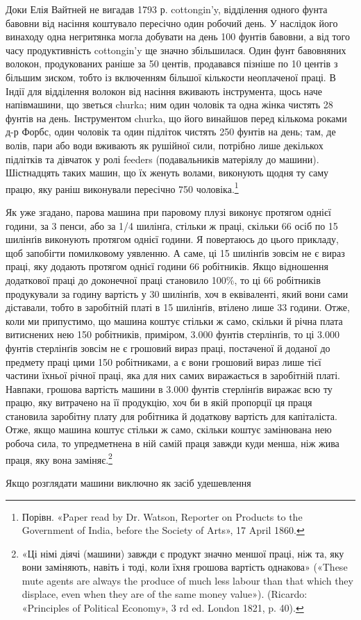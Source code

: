 \parcont{}  %
Доки Елія Вайтней не вигадав 1793 р. cottongin’y, відділення одного
фунта бавовни від насіння коштувало пересічно один робочий
день. У наслідок його винаходу одна негритянка могла добувати
на день 100 фунтів бавовни, а від того часу продуктивність cottongin’y
ще значно збільшилася. Один фунт бавовняних волокон,
продукованих раніше за 50 центів, продавався пізніше по
10 центів з більшим зиском, тобто із включенням більшої кількости
неоплаченої праці. В Індії для відділення волокон від насіння
вживають інструмента, щось наче напівмашини, що зветься
churka; ним один чоловік та одна жінка чистять 28 фунтів на день.
Інструментом churka, що його винайшов перед кількома роками д-р Форбс, один чоловік та один підліток
чистять 250 фунтів на
день; там, де волів, пари або води вживають як рушійної сили,
потрібно лише декількох підлітків та дівчаток у ролі feeders
(подавальників матеріялу до машини). Шістнадцять таких машин,
що їх женуть волами, виконують щодня ту саму працю, яку раніш
виконували пересічно 750 чоловіка.\footnote{
Порівн. «Paper read by Dr. Watson, Reporter on Products to the
Government of India, before the Society of Arts», 17 April 1860.
}

Як уже згадано, парова машина при паровому плузі виконує
протягом однієї години, за 3 пенси, або за 1/4 шилінґа, стільки ж
праці, скільки 66 осіб по 15 шилінґів виконують протягом однієї
години. Я повертаюсь до цього прикладу, щоб запобігти помилковому
уявленню. А саме, ці 15 шилінґів зовсім не є вираз праці, яку
додають протягом однієї години 66 робітників. Якщо відношення
додаткової праці до доконечної праці становило 100\%, то ці
66 робітників продукували за годину вартість у 30 шилінґів,
хоч в еквіваленті, який вони сами діставали, тобто в заробітній
платі в 15 шилінґів, втілено лише 33 години. Отже, коли ми припустимо,
що машина коштує стільки ж само, скільки й річна
плата витиснених нею 150 робітників, приміром, 3.000 фунтів
стерлінґів, то ці 3.000 фунтів стерлінґів зовсім не є грошовий
вираз праці, постаченої й доданої до предмету праці цими 150 робітниками,
а є вони грошовий вираз лише тієї частини їхньої
річної праці, яка для них самих виражається в заробітній платі.
Навпаки, грошова вартість машини в 3.000 фунтів стерлінґів
виражає всю ту працю, яку витрачено на її продукцію, хоч би
в якій пропорції ця праця становила заробітну плату для
робітника й додаткову вартість для капіталіста. Отже, якщо
машина коштує стільки ж само, скільки коштує замінювана нею
робоча сила, то упредметнена в ній самій праця завжди куди
менша, ніж жива праця, яку вона заміняє.\footnote{
«Ці німі діячі (машини) завжди є продукт значно меншої праці,
ніж та, яку вони заміняють, навіть і тоді, коли їхня грошова вартість
однакова» («These mute agents are always the produce of much less labour
than that which they displace, even when they are of the same money
value»). (Ricardo: «Principles of Political Economy», 3 rd ed. London
1821, p. 40).
}

Якщо розглядати машини виключно як засіб удешевлення
\parbreak{}  %
